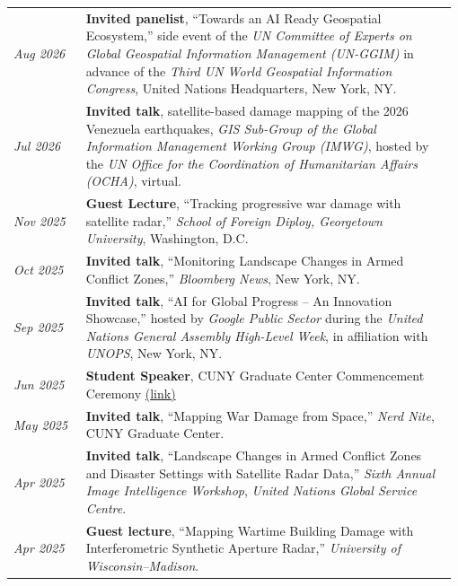 \documentclass[letterpaper,11pt,oneside]{article}
\newcommand{\datefmt}[1]{\textit{#1}}
\begin{document}
\begin{longtable}{@{}p{0.16\linewidth}p{0.82\linewidth}@{}}

\datefmt{Aug 2026} & \textbf{Invited panelist}, “Towards an AI Ready Geospatial Ecosystem,” side event of the \textit{UN Committee of Experts on Global Geospatial Information Management (UN-GGIM)} in advance of the \textit{Third UN World Geospatial Information Congress}, United Nations Headquarters, New York, NY.\\[1.0ex]

\datefmt{Jul 2026} & \textbf{Invited talk}, satellite-based damage mapping of the 2026 Venezuela earthquakes, \textit{GIS Sub-Group of the Global Information Management Working Group (IMWG)}, hosted by the \textit{UN Office for the Coordination of Humanitarian Affairs (OCHA)}, virtual.\\[1.0ex]

\datefmt{Nov 2025} & \textbf{Guest Lecture}, “Tracking progressive war damage with satellite radar,” \textit{School of Foreign Diploy, Georgetown University}, Washington, D.C.\\[1.0ex]

\datefmt{Oct 2025} & \textbf{Invited talk}, “Monitoring Landscape Changes in Armed Conflict Zones,” \textit{Bloomberg News}, New York, NY.\\[1.0ex]

\datefmt{Sep 2025} & \textbf{Invited talk}, “AI for Global Progress – An Innovation Showcase,” hosted by \textit{Google Public Sector} during the \textit{United Nations General Assembly High-Level Week}, in affiliation with \textit{UNOPS}, New York, NY.\\[1.0ex]

\datefmt{Jun 2025} & \textbf{Student Speaker}, CUNY Graduate Center Commencement Ceremony \href{https://www.youtube.com/live/PGjG_v6tYPk?si=izTdTQ7YbH8Zujgv&t=1705}{(link)}\\[1.0ex]

\datefmt{May 2025} & \textbf{Invited talk}, “Mapping War Damage from Space,” \textit{Nerd Nite}, CUNY Graduate Center.\\[1.0ex]

\datefmt{Apr 2025} & \textbf{Invited talk}, “Landscape Changes in Armed Conflict Zones and Disaster Settings with Satellite Radar Data,” \textit{Sixth Annual Image Intelligence Workshop}, \textit{United Nations Global Service Centre}.\\[1.0ex]

\datefmt{Apr 2025} & \textbf{Guest lecture}, “Mapping Wartime Building Damage with Interferometric Synthetic Aperture Radar,” \textit{University of Wisconsin–Madison}.\\[1.0ex]


\end{longtable}
\end{document}
